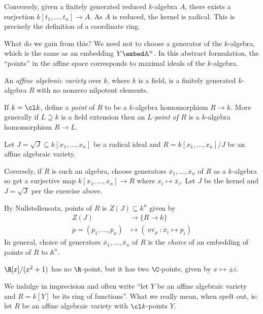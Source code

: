 \documentclass[a4paper]{article}
\renewcommand{\A}{\mathbb{A}}
\begin{document}
Conversely, given a finitely generated reduced \(k\)-algebra \(A\), there exists a surjection \(k[t_1, \dots, t_n] \to A\). As \(A\) is reduced, the kernel is radical. This is precisely the definition of a coordinate ring.

What do we gain from this? We need not to choose a generator of the \(k\)-algebra, which is the same as an embedding \(Y \embed \A^n\). In this abstract formulation, the ``points'' in the affine space corresponds to maximal ideals of the \(k\)-algebra.

\begin{definition}
  An \emph{affine algebraic variety} over \(k\), where \(k\) is a field, is a finitely generated \(k\)-algebra \(R\) with no nonzero nilpotent elements.

  If \(k = \cl k\), define a \emph{point} of \(R\) to be a \(k\)-algebra homomorphism \(R \to k\). More generally if \(L \supseteq k\) is a field extension then an \emph{\(L\)-point of \(R\)} is a \(k\)-algebra homomorphism \(R \to L\).
\end{definition}

\begin{eg}
  Let \(J = \sqrt J \subseteq k[x_1, \dots, x_n]\) be a radical ideal and \(R = k[x_1, \dots, x_n]/J\) be an affine algebraic variety.
  
  Coversely, if \(R\) is such an algebra, choose generators \(\overline x_1, \dots, \overline x_n\) of \(R\) as a \(k\)-algebra so get a surjective map \(k[x_1, \dots, x_n] \to R\) where \(x_i \mapsto \overline x_i\). Let \(J\) be the kernel and \(J = \sqrt J\) per the exercise above.

  By Nullstellensatz, points of \(R\) is \(Z(J) \subseteq k^n\) given by
  \begin{align*}
    Z(J) &\to \{R \to k\} \\
    p = (p_1, \dots, p_n) &\mapsto (\operatorname{ev}_p: \overline x_i \mapsto p_i)
  \end{align*}
  In general, choice of generators \(\overline x_1, \dots, \overline x_n\) of \(R\) is the \emph{choice} of an embedding of points of \(R\) to \(\A^n\).
\end{eg}

\begin{eg}
  \(\R[x]/(x^2 + 1)\) has no \(\R\)-point, but it has two \(\C\)-points, given by \(x \mapsto \pm i\).
\end{eg}

We indulge in imprecision and often write ``let \(Y\) be an affine algebraic variety and \(R = k[Y]\) be its ring of functions''. What we really mean, when spelt out, is: let \(R\) be an affine algebraic variety with \(\cl k\)-points \(Y\).
\end{document}
